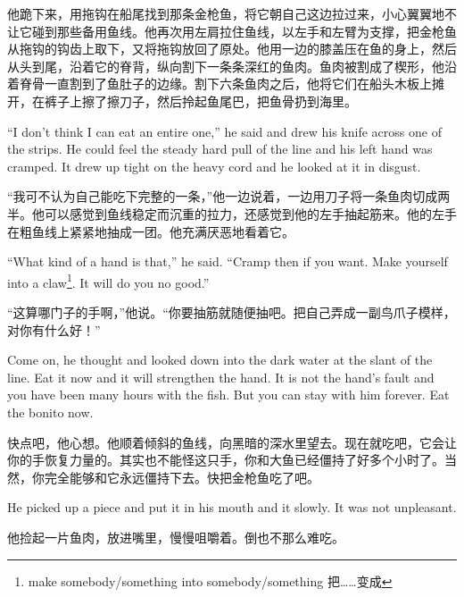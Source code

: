 \begin{paracol}{2}
\switchcolumn

他跪下来，用拖钩在船尾找到那条金枪鱼，将它朝自己这边拉过来，小心翼翼地不让它碰到那些备用鱼线。他再次用左肩拉住鱼线，以左手和左臂为支撑，把金枪鱼从拖钩的钩齿上取下，又将拖钩放回了原处。他用一边的膝盖压在鱼的身上，然后从头到尾，沿着它的脊背，纵向割下一条条深红的鱼肉。鱼肉被割成了楔形，他沿着脊骨一直割到了鱼肚子的边缘。割下六条鱼肉之后，他将它们在船头木板上摊开，在裤子上擦了擦刀子，然后拎起鱼尾巴，把鱼骨扔到海里。

\switchcolumn*

``I don't think I can eat an \gls{entire} one,'' he said and drew his knife
across one of the strips. He could feel the steady hard pull of the line and
his left hand was cramped. It drew up tight on the heavy cord and he
looked at it in \gls{disgust}.

\switchcolumn

“我可不认为自己能吃下完整的一条，”他一边说着，一边用刀子将一条鱼肉切成两半。他可以感觉到鱼线稳定而沉重的拉力，还感觉到他的左手抽起筋来。他的左手在粗鱼线上紧紧地抽成一团。他充满厌恶地看着它。

\switchcolumn*

``What kind of a hand is that,'' he said. ``Cramp then if you want. Make
yourself into a \gls{claw}\footnote{make somebody/something into
  somebody/something 把……变成}. It will do you no good.''

\switchcolumn

“这算哪门子的手啊，”他说。“你要抽筋就随便抽吧。把自己弄成一副鸟爪子模样，对你有什么好！”

\switchcolumn*

Come on, he thought and looked down into the dark water at the slant of the
line. Eat it now and it will \gls{strengthen} the hand. It is not the hand's
fault and you have been many hours with the fish. But you can stay with him
forever. Eat the bonito now.

\switchcolumn

快点吧，他心想。他顺着倾斜的鱼线，向黑暗的深水里望去。现在就吃吧，它会让你的手恢复力量的。其实也不能怪这只手，你和大鱼已经僵持了好多个小时了。当然，你完全能够和它永远僵持下去。快把金枪鱼吃了吧。

\switchcolumn*

He picked up a piece and put it in his mouth and  it slowly. It
was not unpleasant.

\switchcolumn

他捡起一片鱼肉，放进嘴里，慢慢咀嚼着。倒也不那么难吃。


\end{paracol}

